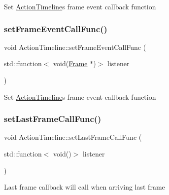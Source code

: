 Set \hyperlink{classActionTimeline}{Action\+Timeline}\textquotesingle{}s frame event callback function \mbox{\label{classActionTimeline_ad1ab1387db4e1f8df9af2d0e339046f2}} 
\subsubsection{\texorpdfstring{set\+Frame\+Event\+Call\+Func()}{setFrameEventCallFunc()}\hspace{0.1cm}{\footnotesize\ttfamily [2/2]}}
{\footnotesize\ttfamily void Action\+Timeline\+::set\+Frame\+Event\+Call\+Func (\begin{DoxyParamCaption}\item[{std\+::function$<$ void(\hyperlink{classFrame}{Frame} $\ast$)$>$}]{listener }\end{DoxyParamCaption})}

Set \hyperlink{classActionTimeline}{Action\+Timeline}\textquotesingle{}s frame event callback function \mbox{\label{classActionTimeline_a1c80f944675b1715d4a06053ebad51fd}} 
\subsubsection{\texorpdfstring{set\+Last\+Frame\+Call\+Func()}{setLastFrameCallFunc()}\hspace{0.1cm}{\footnotesize\ttfamily [1/2]}}
{\footnotesize\ttfamily void Action\+Timeline\+::set\+Last\+Frame\+Call\+Func (\begin{DoxyParamCaption}\item[{std\+::function$<$ void()$>$}]{listener }\end{DoxyParamCaption})}

Last frame callback will call when arriving last frame \mbox{\label{classActionTimeline_a1c80f944675b1715d4a06053ebad51fd}} 
